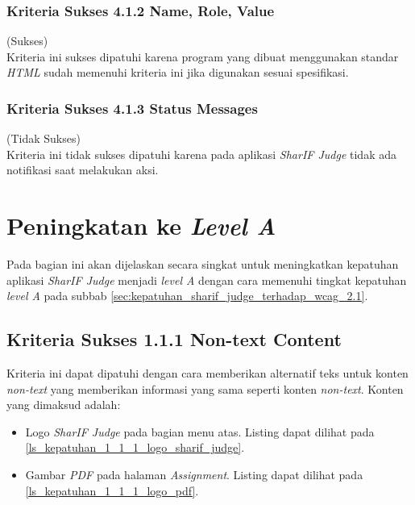 \subsubsection{Kriteria Sukses 4.1.2 Name, Role, Value}
\label{subsubsec:kepatuhan_kriteria_4.1.2}
(Sukses) \\

Kriteria ini sukses dipatuhi karena program yang dibuat menggunakan standar \textit{HTML} sudah memenuhi kriteria ini jika digunakan sesuai spesifikasi.

\subsubsection{Kriteria Sukses 4.1.3 Status Messages}
\label{subsubsec:kepatuhan_kriteria_4.1.3}
(Tidak Sukses) \\

Kriteria ini tidak sukses dipatuhi karena pada aplikasi \textit{SharIF Judge} tidak ada notifikasi saat melakukan aksi.

\section{Peningkatan ke \textit{Level A}}
\label{sec:peningkatan_level_A}

Pada bagian ini akan dijelaskan secara singkat untuk meningkatkan kepatuhan aplikasi \textit{SharIF Judge} menjadi \textit{level A} dengan cara memenuhi tingkat kepatuhan \textit{level A} pada subbab \ref{sec:kepatuhan_sharif_judge_terhadap_wcag_2.1}.

\subsection{Kriteria Sukses 1.1.1 Non-text Content}
\label{subsec:peningkatan_A_1.1.1}

Kriteria ini dapat dipatuhi dengan cara memberikan alternatif teks untuk konten \textit{non-text} yang memberikan informasi yang sama seperti konten \textit{non-text}. Konten yang dimaksud adalah:

\begin{itemize}
	\item Logo \textit{SharIF Judge} pada bagian menu atas. Listing dapat dilihat pada \ref{ls_kepatuhan_1_1_1_logo_sharif_judge}.
	\item Gambar \textit{PDF} pada halaman \textit{Assignment}. Listing dapat dilihat pada \ref{ls_kepatuhan_1_1_1_logo_pdf}.
\end{itemize}


